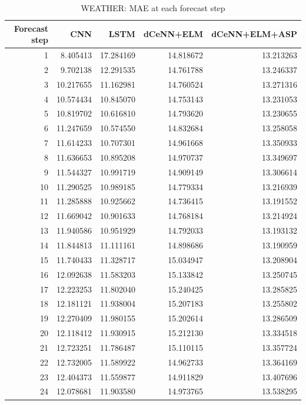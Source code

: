 \begin{table}
\caption{WEATHER: MAE at each forecast step}
\begin{tabular}{rrrrr}
\toprule
Forecast step & CNN & LSTM & dCeNN+ELM & dCeNN+ELM+ASP \\
\midrule
1 & 8.405413 & 17.284169 & 14.818672 & 13.213263 \\
2 & 9.702138 & 12.291535 & 14.761788 & 13.246337 \\
3 & 10.217655 & 11.162981 & 14.760524 & 13.271316 \\
4 & 10.574434 & 10.845070 & 14.753143 & 13.231053 \\
5 & 10.819702 & 10.616810 & 14.793620 & 13.230655 \\
6 & 11.247659 & 10.574550 & 14.832684 & 13.258058 \\
7 & 11.614233 & 10.707301 & 14.961668 & 13.350933 \\
8 & 11.636653 & 10.895208 & 14.970737 & 13.349697 \\
9 & 11.544327 & 10.991719 & 14.909149 & 13.306614 \\
10 & 11.290525 & 10.989185 & 14.779334 & 13.216939 \\
11 & 11.285888 & 10.925662 & 14.736415 & 13.191552 \\
12 & 11.669042 & 10.901633 & 14.768184 & 13.214924 \\
13 & 11.940586 & 10.951929 & 14.792033 & 13.193132 \\
14 & 11.844813 & 11.111161 & 14.898686 & 13.190959 \\
15 & 11.740433 & 11.328717 & 15.034947 & 13.208904 \\
16 & 12.092638 & 11.583203 & 15.133842 & 13.250745 \\
17 & 12.223253 & 11.802040 & 15.240425 & 13.285825 \\
18 & 12.181121 & 11.938004 & 15.207183 & 13.255802 \\
19 & 12.270409 & 11.980155 & 15.202614 & 13.286509 \\
20 & 12.118412 & 11.930915 & 15.212130 & 13.334518 \\
21 & 12.723251 & 11.786487 & 15.110115 & 13.357724 \\
22 & 12.732005 & 11.589922 & 14.962733 & 13.364169 \\
23 & 12.404373 & 11.559877 & 14.911829 & 13.407696 \\
24 & 12.078681 & 11.903580 & 14.973765 & 13.538295 \\
\bottomrule
\end{tabular}
\end{table}
